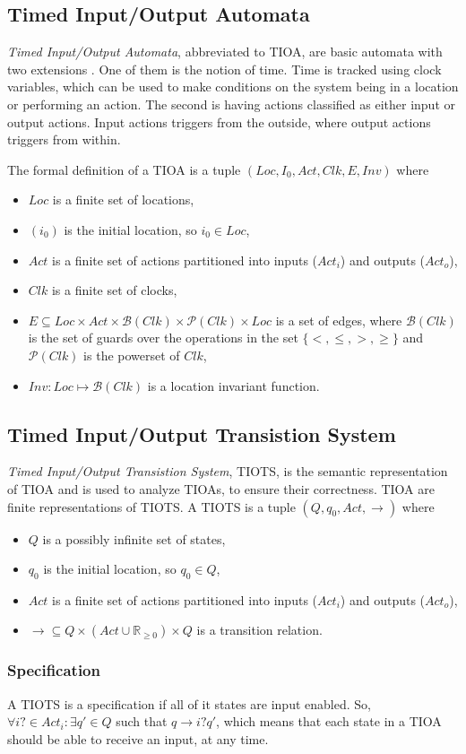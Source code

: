\subsection{Timed Input/Output Automata}\label{sec:TIOA}
\emph{Timed Input/Output Automata}, abbreviated to TIOA, are basic automata with two extensions \cite{ecdartheory}. One of them is the notion of time. Time is tracked using clock variables, which can be used to make conditions on the system being in a location or performing an action. The second is having actions classified as either input or output actions. Input actions triggers from the outside, where output actions triggers from within. 

The formal definition of a TIOA is a tuple \cite{ecdartheory} $(Loc, I_{0}, Act, Clk, E, Inv)$
where

\begin{itemize}
    \item $Loc$ is a finite set of locations,
    \item $(i_{0})$ is the initial location, so $i_{0} \in Loc$,
    \item $Act$ is a finite set of actions partitioned into inputs ($Act_{i}$) and outputs ($Act_{o}$),
    \item $Clk$ is a finite set of clocks,
    \item $E \subseteq Loc \times Act \times \mathcal{B}(Clk) \times \mathcal{P}(Clk) \times Loc$ is a set of edges, where $\mathcal{B}(Clk)$ is the set of guards over the operations in the set $\{<, \leq, >, \geq\}$ and $\mathcal{P}(Clk)$ is the powerset of $Clk$,
    \item $Inv : Loc \mapsto \mathcal{B}(Clk)$ is a location invariant function.
\end{itemize}

\subsection{Timed Input/Output Transistion System}\label{sec:TIOTS}

\emph{Timed Input/Output Transistion System}, TIOTS, is the semantic representation of TIOA and is used to analyze TIOAs, to ensure their correctness. TIOA are finite representations of TIOTS\cite{ecdartheory}. A TIOTS is a tuple\cite{ecdartheory}  $(Q, q_{0}, Act, \rightarrow)$ where

\begin{itemize}
    \item $Q$ is a possibly infinite set of states,
    \item $q_{0}$ is the initial location, so $q_{0} \in Q$,
    \item $Act$ is a finite set of actions partitioned into inputs ($Act_{i}$) and outputs ($Act_{o}$),
    \item $\rightarrow \subseteq Q \times (Act \cup \mathbb{R}_{\geq 0}) \times Q$ is a transition relation.
\end{itemize}

\subsubsection{Specification}
A TIOTS is a specification if all of it states are input enabled. So, $\forall i? \in Act_i : \exists q' \in Q$ such that $q \rightarrow i? q'$, which means that each state in a TIOA should be able to receive an input, at any time. \cite{ecdartheory}